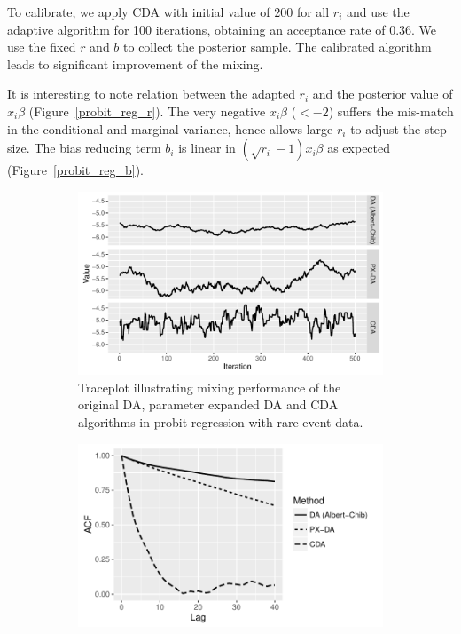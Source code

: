 \documentclass[10pt]{article}
\newcommand{\xbeta}{ x_i \beta}
\begin{document}
To calibrate, we apply CDA with initial value of $200$ for all $r_i$ and use the adaptive algorithm for 100 iterations, obtaining an acceptance rate of $0.36$. We use the fixed $r$ and $b$ to collect the posterior sample. The calibrated algorithm leads to significant improvement of the mixing.

It is interesting to note relation between the adapted $r_i$ and the posterior value of $\xbeta$ (Figure~\ref{probit_reg_r}). The very negative $\xbeta$ ($< -2$) suffers the mis-match in the conditional and marginal variance, hence allows large $r_i$ to adjust the step size. The bias reducing term $b_i$ is linear in $(\sqrt{r_i}-1 ) \xbeta$ as expected (Figure~\ref{probit_reg_b}).
 
 
\begin{figure}[H]
  \begin{subfigure}[b]{0.49\textwidth}
 \includegraphics[width=1\textwidth]{probit15_trace_plot.pdf}
  \caption{Traceplot illustrating mixing performance of the original DA, parameter expanded DA and CDA algorithms in probit regression with rare event data.}
  \label{probit_reg_trace}
\end{subfigure}
  \hfill
   \begin{subfigure}[b]{0.49\textwidth}
 \includegraphics[width=1\textwidth]{probit15_acf.pdf}

\end{subfigure}
\end{figure}
\end{document}

